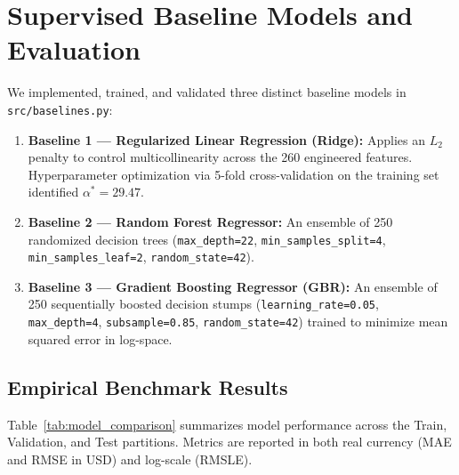 \documentclass[11pt,a4paper]{article}
\begin{document}
\section{Supervised Baseline Models and Evaluation}
We implemented, trained, and validated three distinct baseline models in \texttt{src/baselines.py}:
\begin{enumerate}
    \item \textbf{Baseline 1 — Regularized Linear Regression (Ridge):} Applies an $L_2$ penalty to control multicollinearity across the 260 engineered features. Hyperparameter optimization via 5-fold cross-validation on the training set identified $\alpha^* = 29.47$.
    \item \textbf{Baseline 2 — Random Forest Regressor:} An ensemble of 250 randomized decision trees (\texttt{max\_depth=22}, \texttt{min\_samples\_split=4}, \texttt{min\_samples\_leaf=2}, \texttt{random\_state=42}).
    \item \textbf{Baseline 3 — Gradient Boosting Regressor (GBR):} An ensemble of 250 sequentially boosted decision stumps (\texttt{learning\_rate=0.05}, \texttt{max\_depth=4}, \texttt{subsample=0.85}, \texttt{random\_state=42}) trained to minimize mean squared error in log-space.
\end{enumerate}

\subsection{Empirical Benchmark Results}
Table~\ref{tab:model_comparison} summarizes model performance across the Train, Validation, and Test partitions. Metrics are reported in both real currency (MAE and RMSE in USD) and log-scale (RMSLE).
\end{document}
